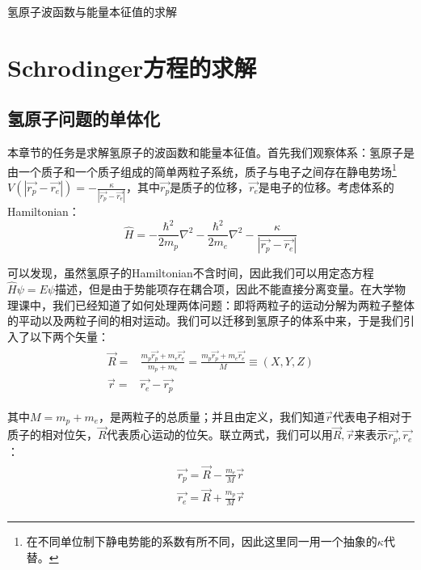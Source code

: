 \begin{introduction}
    \item 氢原子波函数与能量本征值的求解
\end{introduction}
    \section{Schrodinger方程的求解}
        \subsection{氢原子问题的单体化}
            本章节的任务是求解氢原子的波函数和能量本征值。首先我们观察体系：氢原子是由一个质子和一个质子组成的简单两粒子系统，质子与电子之间存在静电势场\footnote{在不同单位制下静电势能的系数有所不同，因此这里同一用一个抽象的$\kappa$代替。}$V(|\vec{r_p}-\vec{r_e}|)=-\frac{\kappa}{|\vec{r_p}-\vec{r_e}|}$，其中$\vec{r_p}$是质子的位移，$\vec{r_e}$是电子的位移。考虑体系的Hamiltonian：
            \begin{equation}
                 \hat{H}=-\frac{\hbar^2}{2m_p}\nabla^2-\frac{\hbar^2}{2m_e}\nabla^2-\frac{\kappa}{|\vec{r_p}-\vec{r_e}|}
            \end{equation}
            
            可以发现，虽然氢原子的Hamiltonian不含时间，因此我们可以用定态方程$\hat{H}\psi=E\psi$描述，但是由于势能项存在耦合项，因此不能直接分离变量。在大学物理课中，我们已经知道了如何处理两体问题：即将两粒子的运动分解为两粒子整体的平动以及两粒子间的相对运动。我们可以迁移到氢原子的体系中来，于是我们引入了以下两个矢量：
            \begin{align}
                \begin{split}
                    \vec{R}=&\frac{m_p\vec{r_p}+m_e\vec{r_e}}{m_p+m_e}=\frac{m_p\vec{r_p}+m_e\vec{r_e}}{M}\equiv (X,Y,Z)\\
                    \vec{r}=&\vec{r_e}-\vec{r_p}
                \end{split}
            \end{align}
            
            其中$M=m_p+m_e$，是两粒子的总质量；并且由定义，我们知道$\vec{r}$代表电子相对于质子的相对位矢，$\vec{R}$代表质心运动的位矢。联立两式，我们可以用$\vec{R},\vec{r}$来表示$\vec{r_p},\vec{r_e}$：
            \begin{align}\label{equ6:transformformotion}
                \begin{split}
                    \vec{r_p}=\vec{R}-\frac{m_e}{M}\vec{r}\\
                    \vec{r_e}=\vec{R}+\frac{m_p}{M}\vec{r}
                \end{split}
            \end{align}
            

